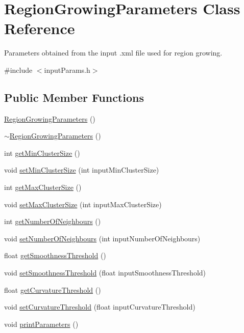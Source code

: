 \hypertarget{classRegionGrowingParameters}{\section{Region\-Growing\-Parameters Class Reference}
\label{classRegionGrowingParameters}
}


Parameters obtained from the input .xml file used for region growing.  




{\ttfamily \#include $<$input\-Params.\-h$>$}

\subsection*{Public Member Functions}
\begin{DoxyCompactItemize}
\item 
\hyperlink{classRegionGrowingParameters_ae9c8ea8b35c11fbfaa4be9aaea6eef0f}{Region\-Growing\-Parameters} ()
\item 
\hyperlink{classRegionGrowingParameters_a7dea5b8da45dcf55559019d8af54953d}{$\sim$\-Region\-Growing\-Parameters} ()
\item 
int \hyperlink{classRegionGrowingParameters_a531579656ff1d1422b98b3ddf82602de}{get\-Min\-Cluster\-Size} ()
\item 
void \hyperlink{classRegionGrowingParameters_a1ef042e88bd38d69f9f09924369eef51}{set\-Min\-Cluster\-Size} (int input\-Min\-Cluster\-Size)
\item 
int \hyperlink{classRegionGrowingParameters_a585d56a040eb8d2cb1ed094404220b32}{get\-Max\-Cluster\-Size} ()
\item 
void \hyperlink{classRegionGrowingParameters_ab7d388ba4779c3e3b314569ab105cb93}{set\-Max\-Cluster\-Size} (int input\-Max\-Cluster\-Size)
\item 
int \hyperlink{classRegionGrowingParameters_a1e3a1f14686ac2bc805fb33271778177}{get\-Number\-Of\-Neighbours} ()
\item 
void \hyperlink{classRegionGrowingParameters_a7c8210de328a8d93981906c913b194e1}{set\-Number\-Of\-Neighbours} (int input\-Number\-Of\-Neighbours)
\item 
float \hyperlink{classRegionGrowingParameters_aacba2b70f586d9b56f33c5b01483d82e}{get\-Smoothness\-Threshold} ()
\item 
void \hyperlink{classRegionGrowingParameters_a5a73060fdb286d2782105a0aa19f72c8}{set\-Smoothness\-Threshold} (float input\-Smoothness\-Threshold)
\item 
float \hyperlink{classRegionGrowingParameters_afda7aa25975821f6b36afbd056f04e4f}{get\-Curvature\-Threshold} ()
\item 
void \hyperlink{classRegionGrowingParameters_a14d1bc934a180381819ae09bcfc772b8}{set\-Curvature\-Threshold} (float input\-Curvature\-Threshold)
\item 
void \hyperlink{classRegionGrowingParameters_a25055696317ddbb3fab7934c1c088b08}{print\-Parameters} ()
\end{DoxyCompactItemize}
